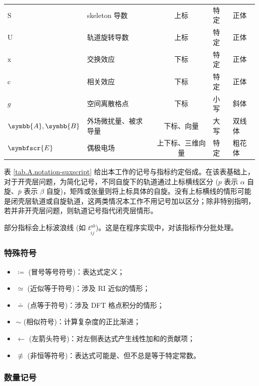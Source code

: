 \begin{table}[!ht]
{\begin{tabular}{llcll}
    $\mathrm{S}$ & skeleton 导数 & 上标 & 特定 & 正体 \\
    $\mathrm{U}$ & 轨道旋转导数 & 上标 & 特定 & 正体 \\
    $\mathrm{x}$ & 交换效应 & 下标 & 特定 & 正体 \\
    $\mathrm{c}$ & 相关效应 & 下标 & 特定 & 正体 \\
    $g$ & 空间离散格点 & 下标 & 小写 & 斜体 \\
    $\symbb{A}, \symbb{B}$ & 外场微扰量、被求导量 & 下标、向量 & 大写 & 双线体 \\
    $\symbfscr{E}$ & 偶极电场 & 上下标、三维向量 & 特定 & 粗花体 \\
    \bottomrule
    \end{tabular}
}{}
\end{table}

表 \ref{tab.A.notation-suxscript} 给出本工作的记号与指标约定俗成。在该表基础上，对于开壳层问题，为简化记号，不同自旋下的轨道通过上标横线区分 ($p$ 表示 $\alpha$ 自旋、$\bar p$ 表示 $\beta$ 自旋)，矩阵或张量则将上标具体的自旋。没有上标横线的情形可能是闭壳层轨道或自旋轨道，这两类情况本工作不用记号加以区分；除非特别指明，若并非开壳层问题，则轨道记号指代闭壳层情形。

部分指标会上标波浪线 (如 $t_{\tilde{i} j}^{ab}$)。这是在程序实现中，对该指标作分批处理。

\subsubsection{特殊符号}

\begin{itemize}[nosep]
    \item $\coloneq$ (冒号等号符号)：表达式定义；
    \item $\simeq$ (近似等于符号)：涉及 RI 近似的情形；
    \item $\doteq$ (点等于符号)：涉及 DFT 格点积分的情形；
    \item $\sim$ (相似符号)：计算复杂度的正比渐进；
    \item $\leftarrow$ (左箭头符号)：对左侧表达式产生线性加和的贡献项；
    \item $\not \equiv$ (非恒等符号)：表达式可能是、但不总是等于特定常数。
\end{itemize}

\subsubsection{数量记号}

